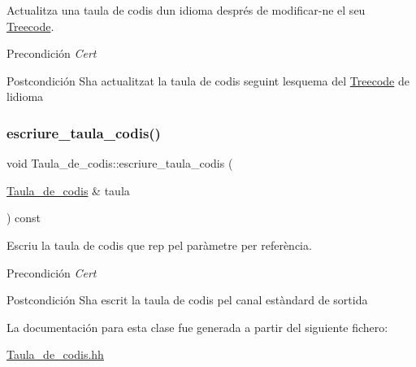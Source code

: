 Actualitza una taula de codis d\textquotesingle{}un idioma després de modificar-\/ne el seu \hyperlink{class_treecode}{Treecode}. 

\begin{DoxyPrecond}{Precondición}
{\itshape Cert} 
\end{DoxyPrecond}
\begin{DoxyPostcond}{Postcondición}
S\textquotesingle{}ha actualitzat la taula de codis seguint l\textquotesingle{}esquema del \hyperlink{class_treecode}{Treecode} de l\textquotesingle{}idioma 
\end{DoxyPostcond}
\mbox{\label{class_taula__de__codis_a535e14648f1a4f3799d4204d4819a78f}} 
\subsubsection{\texorpdfstring{escriure\+\_\+taula\+\_\+codis()}{escriure\_taula\_codis()}}
{\footnotesize\ttfamily void Taula\+\_\+de\+\_\+codis\+::escriure\+\_\+taula\+\_\+codis (\begin{DoxyParamCaption}\item[{\hyperlink{class_taula__de__codis}{Taula\+\_\+de\+\_\+codis} \&}]{taula }\end{DoxyParamCaption}) const}



Escriu la taula de codis que rep pel paràmetre per referència. 

\begin{DoxyPrecond}{Precondición}
{\itshape Cert} 
\end{DoxyPrecond}
\begin{DoxyPostcond}{Postcondición}
S\textquotesingle{}ha escrit la taula de codis pel canal estàndard de sortida 
\end{DoxyPostcond}


La documentación para esta clase fue generada a partir del siguiente fichero\+:\begin{DoxyCompactItemize}
\item 
\hyperlink{_taula__de__codis_8hh}{Taula\+\_\+de\+\_\+codis.\+hh}\end{DoxyCompactItemize}
